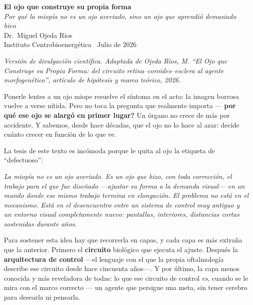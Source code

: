 \documentclass[10pt,a4paper]{article}
\providecommand{\enquote}[1]{``#1''}
\newcommand{\thesisquote}[1]{%
\par\medskip
\begingroup
\begin{center}
\begin{minipage}{0.86\linewidth}
\itshape\small #1
\end{minipage}
\end{center}
\endgroup
\medskip}
\begin{document}
\shorthandoff{<>}%

\begin{center}
{\LARGE\bfseries El ojo que construye su propia forma}\\[6pt]
{\large\itshape Por qu\'e la miop\'ia no es un ojo averiado, sino un ojo que aprendi\'o demasiado bien}\\[14pt]
{\large Dr.\ Miguel Ojeda Rios\footnotemark}\\[3pt]
{\small\color{gtext} Instituto Centrobioenerg\'etica \textbullet\ Julio de 2026}
\end{center}

\vspace{1.2em}
{\small\itshape Versi\'on de divulgaci\'on cient\'ifica. Adaptada de Ojeda Rios, M. \enquote{El Ojo que Construye su Propia Forma: del circuito retina--coroides--esclera al agente morfogen\'etico}, art\'iculo de hip\'otesis y marco te\'orico, 2026.}
\vspace{1em}

\noindent Ponerle lentes a un ojo miope resuelve el s\'intoma en el acto: la imagen borrosa vuelve a verse n\'itida. Pero no toca la pregunta que realmente importa --- \textbf{\textquestiondown por qu\'e ese ojo se alarg\'o en primer lugar?} Un \'organo no crece de m\'as por accidente. Y sabemos, desde hace d\'ecadas, que el ojo no lo hace al azar: decide cu\'anto crecer en funci\'on de lo que ve.

La tesis de este texto es inc\'omoda porque le quita al ojo la etiqueta de \enquote{defectuoso}:

\thesisquote{La miop\'ia no es un ojo averiado. Es un ojo que hizo, con toda correcci\'on, el trabajo para el que fue dise\~nado ---ajustar su forma a la demanda visual--- en un mundo donde ese mismo trabajo termina en elongaci\'on. El problema no est\'a en el mecanismo. Est\'a en el desencuentro entre un sistema de control muy antiguo y un entorno visual completamente nuevo: pantallas, interiores, distancias cortas sostenidas durante a\~nos.}

Para sostener esta idea hay que recorrerla en capas, y cada capa es m\'as extra\~na que la anterior. Primero el \textbf{circuito} biol\'ogico que ejecuta el ajuste. Despu\'es la \textbf{arquitectura de control} ---el lenguaje con el que la propia oftalmolog\'ia describe ese circuito desde hace cincuenta a\~nos---. Y por \'ultimo, la capa menos conocida y m\'as reveladora de todas: lo que ese circuito de control \emph{es}, cuando se le mira con el marco correcto --- un agente que persigue una meta, sin tener cerebro para desearla ni pensarla.
\end{document}
